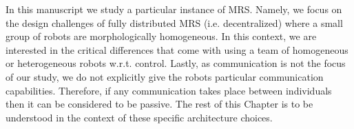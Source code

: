     In this manuscript we study a particular instance of MRS. Namely, we focus on the design challenges of fully distributed MRS (i.e. decentralized) where a small group of robots are morphologically homogeneous. In this context, we are interested in the critical differences that come with using a team of homogeneous or heterogeneous robots w.r.t. control. Lastly, as communication is not the focus of our study, we do not explicitly give the robots particular communication capabilities. Therefore, if any communication takes place between individuals then it can be considered to be passive. The rest of this Chapter is to be understood in the context of these specific architecture choices.







